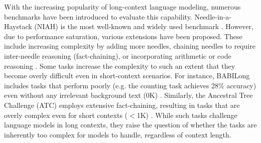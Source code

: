 
With the increasing popularity of long-context language modeling, numerous benchmarks have been introduced to evaluate this capability. Needle-in-a-Haystack (NIAH) is the most well-known and widely used benchmark \cite{mohtashami2023randomaccess, kamradt2023needle}. However, due to performance saturation, various extensions have been proposed. These include increasing complexity by adding more needles, chaining needles to require inter-needle reasoning (fact-chaining), or incorporating arithmetic or code reasoning \cite{kamradt2023needle, hsieh2024ruler, levy-etal-2024-task, kuratov2024babilong, hengle2024multilingual, zhang2024inftybenchextendinglongcontext, vodrahalli2024michelangelolongcontextevaluations}.
Some tasks increase the complexity to such an extent that they become overly difficult even in short-context scenarios. For instance, BABILong includes tasks that perform poorly (e.g. the counting task achieves 28\% accuracy) even without any irrelevant background text (0K) \cite{kuratov2024babilong}. Similarly, the Ancestral Tree Challenge (ATC) employs extensive fact-chaining, resulting in tasks that are overly complex even for short contexts ($<$1K) \cite{li2024needlebenchllmsretrievalreasoning}.
While such tasks challenge language models in long contexts, they raise the question of whether the tasks are inherently too complex for models to handle, regardless of context length.


